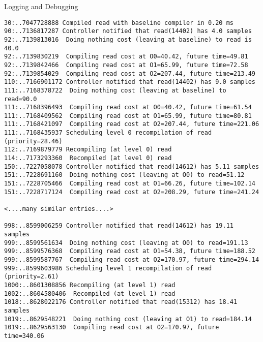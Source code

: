 \begin{section}{Logging and Debugging}
\begin{lstlisting}
30:..7047728888 Compiled read with baseline compiler in 0.20 ms
90:..7136817287 Controller notified that read(14402) has 4.0 samples
92:..7139813016  Doing nothing cost (leaving at baseline) to read is 40.0
92:..7139830219  Compiling read cost at O0=40.42, future time=49.81
92:..7139842466  Compiling read cost at O1=65.99, future time=72.58
92:..7139854029  Compiling read cost at O2=207.44, future time=213.49
110:..7166901172 Controller notified that read(14402) has 9.0 samples
111:..7168378722  Doing nothing cost (leaving at baseline) to read=90.0
111:..7168396493  Compiling read cost at O0=40.42, future time=61.54
111:..7168409562  Compiling read cost at O1=65.99, future time=80.81
111:..7168421097  Compiling read cost at O2=207.44, future time=221.06
111:..7168435937 Scheduling level 0 recompilation of read (priority=28.46)
112:..7169879779 Recompiling (at level 0) read
114:..7173293360  Recompiled (at level 0) read
150:..7227058078 Controller notified that read(14612) has 5.11 samples
151:..7228691160  Doing nothing cost (leaving at O0) to read=51.12
151:..7228705466  Compiling read cost at O1=66.26, future time=102.14
151:..7228717124  Compiling read cost at O2=208.29, future time=241.24

<....many similar entries....>

998:..8599006259 Controller notified that read(14612) has 19.11 samples
999:..8599561634  Doing nothing cost (leaving at O0) to read=191.13
999:..8599576368  Compiling read cost at O1=54.38, future time=188.52
999:..8599587767  Compiling read cost at O2=170.97, future time=294.14
999:..8599603986 Scheduling level 1 recompilation of read (priority=2.61)
1000:..8601308856 Recompiling (at level 1) read
1002:..8604580406  Recompiled (at level 1) read
1018:..8628022176 Controller notified that read(15312) has 18.41 samples
1019:..8629548221  Doing nothing cost (leaving at O1) to read=184.14
1019:..8629563130  Compiling read cost at O2=170.97, future time=340.06
\end{lstlisting}


\end{section}
